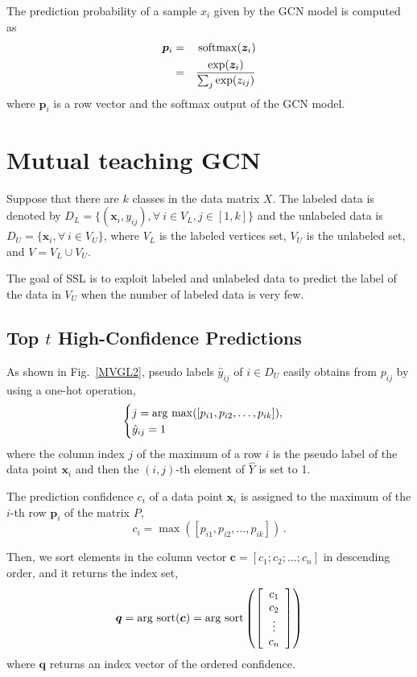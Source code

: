 \documentclass{article}
\newcommand{\x}{{\bm x}}
\newcommand{\z}{{\bm z}}
\newcommand{\p}{{\bm c}}
\newcommand{\q}{{\bm q}}
\newcommand{\argsort}{\mathop{\rm arg~sort}\limits}
\newcommand{\argmax}{\mathop{\rm arg~max}\limits}
\begin{document}
The prediction probability of a sample $x_i$ given by the GCN model is computed as
\begin{eqnarray}
{\bm p}_i&=&{\rm softmax}(\z_i)\\
& =& \frac{\exp(\z_i)}{\sum_j\exp(z_{ij})}
\end{eqnarray}
where ${\bm p}_i$ is a row vector and the {\rm softmax} output of the GCN model.
\section{Mutual teaching GCN}\label{sec_MLGCN}
Suppose that there are $k$ classes in the data matrix $X$. The labeled data is denoted by $D_L=\{(\x_i, y_{ij}), \forall~i\in V_L,j\in[1,k]\}$ and the unlabeled data is $D_U=\{\x_i, \forall~i\in V_U\}$, where $V_L$ is the labeled vertices set, $V_U$ is the unlabeled set, and $V = V_L \cup V_U$.

The goal of SSL is to exploit labeled and unlabeled data to predict the label of the data in $V_U$ when the number of labeled data is very few.
\subsection{Top $t$ High-Confidence Predictions}\label{topt}
As shown in Fig.~\ref{MVGL2}, pseudo labels $\hat{y}_{ij}$ of $i\in D_U$ easily obtains from $p_{ij}$ by using a one-hot operation,
\begin{equation}\label{yij}
\begin{cases}
j=\argmax([p_{i1},p_{i2},\ldots,p_{ik}]),\\
\hat{y}_{ij}=1
\end{cases}
\end{equation}
where the column index $j$ of the maximum of a row $i$ is the pseudo label of the data point $\x_i$ and then the $(i,j)$-th element of $\hat{Y}$ is set to 1.

The prediction confidence $c_i$ of a data point $\x_i$ is assigned to the maximum of the $i$-th row $\bm{p}_i$ of the matrix $P$,
\begin{equation}\label{pc}
c_i=\max([p_{i1},p_{i2},\ldots,p_{ik}])\,.
\end{equation}

Then, we sort elements in the column vector $\p=[c_1;c_2;\ldots;c_n]$ in descending order, and it returns the index set,
\begin{equation}\label{q_index}
\q=\argsort(\p)=\argsort\left(
\left[
  \begin{array}{c}
    c_1 \\
    c_2 \\
    \vdots \\
    c_n \\
  \end{array}
\right]
\right)
\end{equation}
where $\q$ returns an index vector of the ordered confidence.
\end{document}
